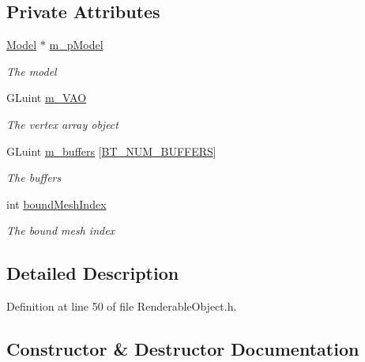 \subsection*{Private Attributes}
\begin{DoxyCompactItemize}
\item 
\hyperlink{class_model}{Model} $\ast$ \hyperlink{class_renderable_object_aab96dcc31d9e748645868c9449ae8cb6}{m\+\_\+p\+Model}
\begin{DoxyCompactList}\small\item\em The model \end{DoxyCompactList}\item 
G\+Luint \hyperlink{class_renderable_object_adf71c359139a157f0513f06a04d6a81d}{m\+\_\+\+V\+AO}
\begin{DoxyCompactList}\small\item\em The vertex array object \end{DoxyCompactList}\item 
G\+Luint \hyperlink{class_renderable_object_abee52bb51bcb4392073cbb890d39a216}{m\+\_\+buffers} \mbox{[}\hyperlink{_renderable_object_8h_a3e5d410ec73ff739b77335fae2a20d37ad7826b7cb87e89d794e8e1f9c9464730}{B\+T\+\_\+\+N\+U\+M\+\_\+\+B\+U\+F\+F\+E\+RS}\mbox{]}
\begin{DoxyCompactList}\small\item\em The buffers \end{DoxyCompactList}\item 
int \hyperlink{class_renderable_object_abcef64954c2b642329db5a14a66a6fd6}{bound\+Mesh\+Index}
\begin{DoxyCompactList}\small\item\em The bound mesh index \end{DoxyCompactList}\end{DoxyCompactItemize}


\subsection{Detailed Description}


Definition at line 50 of file Renderable\+Object.\+h.



\subsection{Constructor \& Destructor Documentation}
